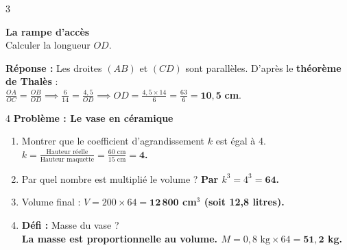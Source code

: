 \documentclass[a4paper]{book}
\begin{document}
{    \begin{exerciceNote}{3}
        \begin{minipage}{0.4\linewidth}
            \textbf{La rampe d'accès} \\
            Calculer la longueur $OD$.
        \end{minipage}
        \hfill
        \begin{minipage}{0.39\linewidth}
            \begin{center}
            \end{center}
        \end{minipage}
        
        \textbf{Réponse :} Les droites $(AB)$ et $(CD)$ sont parallèles. D'après le \textbf{théorème de Thalès} : \\
        $\frac{OA}{OC} = \frac{OB}{OD} \implies \frac{6}{14} = \frac{4,5}{OD} \implies OD = \frac{4,5 \times 14}{6} = \frac{63}{6} = \mathbf{10,5}$ \textbf{cm}.
    \end{exerciceNote}

    \begin{exerciceNote}{4}
        \textbf{Problème : Le vase en céramique}
        \begin{enumerate}
            \item Montrer que le coefficient d'agrandissement $k$ est égal à 4. \\
            \textbf{$k = \frac{\text{Hauteur réelle}}{\text{Hauteur maquette}} = \frac{60 \text{ cm}}{15 \text{ cm}} = \mathbf{4}$.}
            \item Par quel nombre est multiplié le volume ? \textbf{Par $k^3 = 4^3 = \mathbf{64}$.}
            \item Volume final : \textbf{$V = 200 \times 64 = \mathbf{12\,800}$ cm$^3$ (soit 12,8 litres).}
            \item \textbf{Défi :} Masse du vase ? \\
            \textbf{La masse est proportionnelle au volume. $M = 0,8 \text{ kg} \times 64 = \mathbf{51,2}$ kg.}
        \end{enumerate}
    \end{exerciceNote}

}
\end{document}
